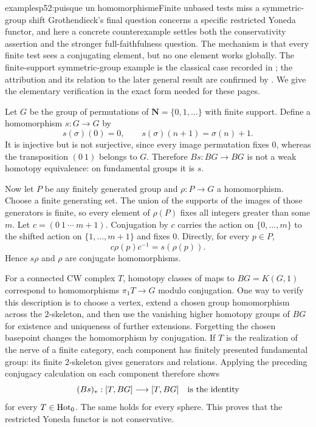 \begin{dcomment}{examples}{p52:puisque un homomorphisme}{Finite unbased tests miss a symmetric-group shift}
Grothendieck's final question concerns a specific restricted Yoneda functor, and here a concrete counterexample settles both the conservativity assertion and the stronger full-faithfulness question. The mechanism is that every finite test sees a conjugating element, but no one element works globally. The finite-support symmetric-group example is the classical case recorded in \citet[Proposition~4.1]{MatumotoMinamiSugawara1984}; the attribution and its relation to the later general result are confirmed by \citet[Remark~2.3]{ArlinChristensen2023}. We give the elementary verification in the exact form needed for these pages.

Let $G$ be the group of permutations of $\mathbf N=\{0,1,\ldots\}$ with finite support. Define a homomorphism $s:G\to G$ by
\[
 s(\sigma)(0)=0,\qquad s(\sigma)(n+1)=\sigma(n)+1.
\]
It is injective but is not surjective, since every image permutation fixes $0$, whereas the transposition $(0\ 1)$ belongs to $G$. Therefore $Bs:BG\to BG$ is not a weak homotopy equivalence: on fundamental groups it is $s$.

Now let $P$ be any finitely generated group and $\rho:P\to G$ a homomorphism. Choose a finite generating set. The union of the supports of the images of those generators is finite, so every element of $\rho(P)$ fixes all integers greater than some $m$. Let $c=(0\ 1\ \cdots\ m+1)$. Conjugation by $c$ carries the action on $\{0,\ldots,m\}$ to the shifted action on $\{1,\ldots,m+1\}$ and fixes $0$. Directly, for every $p\in P$,
\[
 c\rho(p)c^{-1}=s(\rho(p)).
\]
Hence $s\rho$ and $\rho$ are conjugate homomorphisms.

For a connected CW complex $T$, homotopy classes of maps to $BG=K(G,1)$ correspond to homomorphisms $\pi_1T\to G$ modulo conjugation. One way to verify this description is to choose a vertex, extend a chosen group homomorphism across the $2$-skeleton, and then use the vanishing higher homotopy groups of $BG$ for existence and uniqueness of further extensions. Forgetting the chosen basepoint changes the homomorphism by conjugation. If $T$ is the realization of the nerve of a finite category, each component has finitely presented fundamental group: its finite $2$-skeleton gives generators and relations. Applying the preceding conjugacy calculation on each component therefore shows
\[
 (Bs)_*:[T,BG]\longrightarrow[T,BG]
       \quad\hbox{is the identity}
\]
for every $T\in\mathrm{Hot}_0$. The same holds for every sphere. This proves that the restricted Yoneda functor is not conservative.


\end{dcomment}

